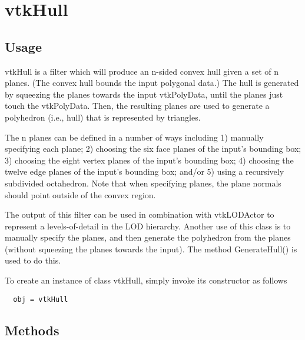\section{vtkHull}

\subsection{Usage}

 vtkHull is a filter which will produce an n-sided convex hull given a
 set of n planes. (The convex hull bounds the input polygonal data.)
 The hull is generated by squeezing the planes towards the input
 vtkPolyData, until the planes just touch the vtkPolyData. Then,
 the resulting planes are used to generate a polyhedron (i.e., hull)
 that is represented by triangles.

 The n planes can be defined in a number of ways including 1) manually 
 specifying each plane; 2) choosing the six face planes of the input's
 bounding box; 3) choosing the eight vertex planes of the input's
 bounding box; 4) choosing the twelve edge planes of the input's
 bounding box; and/or 5) using a recursively subdivided octahedron.
 Note that when specifying planes, the plane normals should point
 outside of the convex region.

 The output of this filter can be used in combination with vtkLODActor 
 to represent a levels-of-detail in the LOD hierarchy. Another use of
 this class is to manually specify the planes, and then generate the
 polyhedron from the planes (without squeezing the planes towards the
 input). The method GenerateHull() is used to do this.

To create an instance of class vtkHull, simply
invoke its constructor as follows
\begin{verbatim}
  obj = vtkHull
\end{verbatim}
\subsection{Methods}

